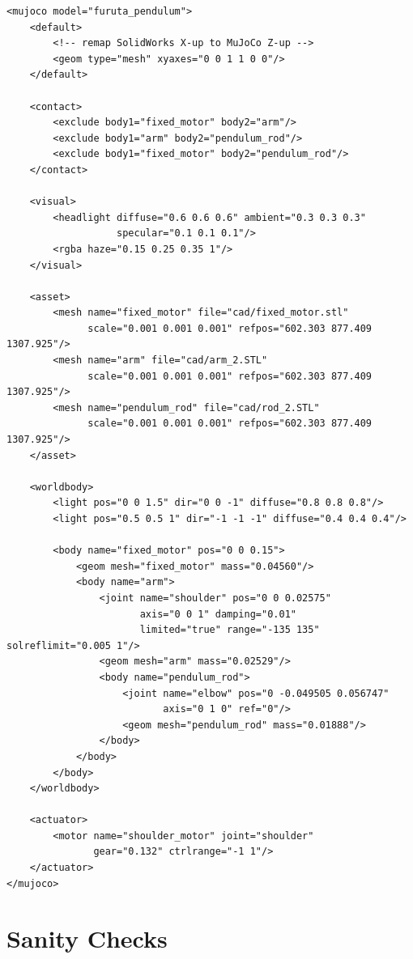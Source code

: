 \documentclass[12pt,a4paper]{article}
\begin{document}
\begin{lstlisting}[style=xml]
<mujoco model="furuta_pendulum">
    <default>
        <!-- remap SolidWorks X-up to MuJoCo Z-up -->
        <geom type="mesh" xyaxes="0 0 1 1 0 0"/>
    </default>

    <contact>
        <exclude body1="fixed_motor" body2="arm"/>
        <exclude body1="arm" body2="pendulum_rod"/>
        <exclude body1="fixed_motor" body2="pendulum_rod"/>
    </contact>

    <visual>
        <headlight diffuse="0.6 0.6 0.6" ambient="0.3 0.3 0.3"
                   specular="0.1 0.1 0.1"/>
        <rgba haze="0.15 0.25 0.35 1"/>
    </visual>

    <asset>
        <mesh name="fixed_motor" file="cad/fixed_motor.stl"
              scale="0.001 0.001 0.001" refpos="602.303 877.409 1307.925"/>
        <mesh name="arm" file="cad/arm_2.STL"
              scale="0.001 0.001 0.001" refpos="602.303 877.409 1307.925"/>
        <mesh name="pendulum_rod" file="cad/rod_2.STL"
              scale="0.001 0.001 0.001" refpos="602.303 877.409 1307.925"/>
    </asset>

    <worldbody>
        <light pos="0 0 1.5" dir="0 0 -1" diffuse="0.8 0.8 0.8"/>
        <light pos="0.5 0.5 1" dir="-1 -1 -1" diffuse="0.4 0.4 0.4"/>

        <body name="fixed_motor" pos="0 0 0.15">
            <geom mesh="fixed_motor" mass="0.04560"/>
            <body name="arm">
                <joint name="shoulder" pos="0 0 0.02575"
                       axis="0 0 1" damping="0.01"
                       limited="true" range="-135 135" solreflimit="0.005 1"/>
                <geom mesh="arm" mass="0.02529"/>
                <body name="pendulum_rod">
                    <joint name="elbow" pos="0 -0.049505 0.056747"
                           axis="0 1 0" ref="0"/>
                    <geom mesh="pendulum_rod" mass="0.01888"/>
                </body>
            </body>
        </body>
    </worldbody>

    <actuator>
        <motor name="shoulder_motor" joint="shoulder"
               gear="0.132" ctrlrange="-1 1"/>
    </actuator>
</mujoco>
\end{lstlisting}

\section{Sanity Checks}
\end{document}
